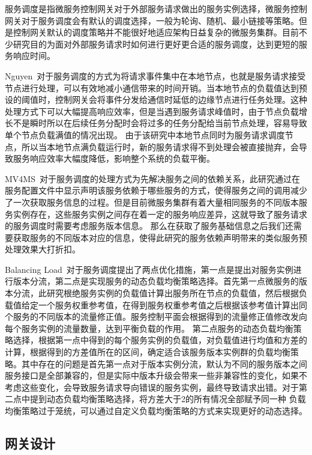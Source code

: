 服务调度是指微服务控制网关对于外部服务请求做出的服务实例选择，微服务控制网关对于服务调度会有默认的调度选择，一般为轮询、随机、最小链接等策略。但是控制网关默认的调度策略并不能很好地适应架构日益复杂的微服务集群。目前不少研究目的为面对外部服务请求时如何进行更好更合适的服务调度，达到更短的服务响应时间。 \par
Nguyen~\citep{s22082869}对于服务调度的方式为将请求事件集中在本地节点，也就是服务请求接受节点进行处理，可以有效地减小通信带来的时间开销。当本地节点的负载值达到预设的阈值时，控制网关会将事件分发给通信时延低的边缘节点进行任务处理。这种处理方式下可以大幅提高响应效率，但是当遇到服务请求峰值时，由于节点负载增长不是瞬时所以在后续任务分配时会将过多的任务分配给当前节点处理，容易导致单个节点负载满值的情况出现。
由于该研究中本地节点同时为服务请求调度节点，所以当本地节点满负载运行时，新的服务请求得不到处理会被直接抛弃，会导致服务响应效率大幅度降低，影响整个系统的负载平衡。 \par
MV4MS~\citep{9284506}对于服务调度的处理方式为先解决服务之间的依赖关系，此研究通过在服务配置文件中显示声明该服务依赖于哪些服务的方式，使得服务之间的调用减少了一次获取服务信息的过程。但是目前微服务集群有着大量相同服务的不同版本服务实例存在，这些服务实例之间存在着一定的服务响应差异，这就导致了服务请求的服务调度时需要考虑服务版本信息。
那么在获取了服务基础信息之后我们还需要获取服务的不同版本对应的信息，使得此研究的服务依赖声明带来的类似服务预处理效果大打折扣。\par
Balancing Load~\citep{10077895}对于服务调度提出了两点优化措施，第一点是提出对服务实例进行版本分流，第二点是实现服务的动态负载均衡策略选择。首先第一点微服务的版本分流，此研究根绝服务实例的负载值计算出服务所在节点的负载值，然后根据负载值给定一个服务权重参考值，在得到服务权重参考值之后根据该参考值计算出同个服务的不同版本的流量修正值。服务控制平面会根据得到的流量修正值修改发向每个服务实例的流量数量，达到平衡负载的作用。
第二点服务的动态负载均衡策略选择，根据第一点中得到的每个服务实例的负载值，对负载值进行均值和方差的计算，根据得到的方差值所在的区间，确定适合该服务版本实例群的负载均衡策略。其中存在的问题是首先第一点对于版本实例分流，默认为不同的服务版本之间服务接口是全部兼容的，但是实际中版本升级会带来一些非兼容性的变化，如果不考虑这些变化，会导致服务请求导向错误的服务实例，最终导致请求出错。对于第二点中提到动态负载均衡策略选择，将方差大于2的所有情况全部赋予同一种
负载均衡策略过于笼统，可以通过自定义负载均衡策略的方式来实现更好的动态选择。

\subsection{网关设计}

